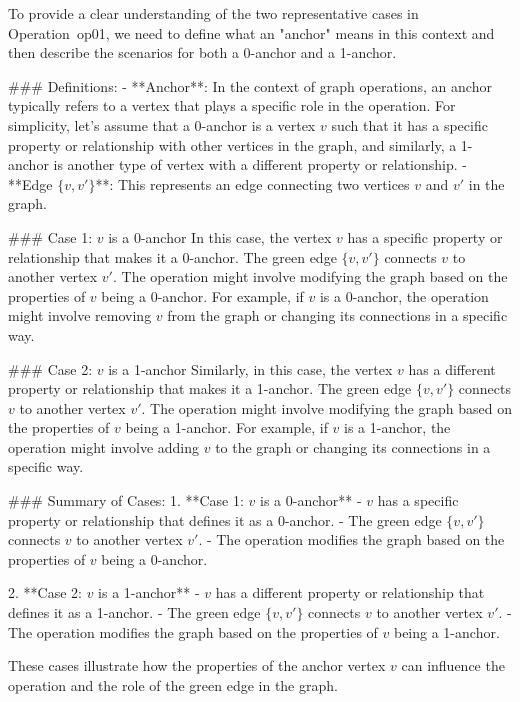 To provide a clear understanding of the two representative cases in Operation~op01, we need to define what an "anchor" means in this context and then describe the scenarios for both a 0-anchor and a 1-anchor.

### Definitions:
- **Anchor**: In the context of graph operations, an anchor typically refers to a vertex that plays a specific role in the operation. For simplicity, let's assume that a 0-anchor is a vertex \( v \) such that it has a specific property or relationship with other vertices in the graph, and similarly, a 1-anchor is another type of vertex with a different property or relationship.
- **Edge \(\{v, v'\}\)**: This represents an edge connecting two vertices \( v \) and \( v' \) in the graph.

### Case 1: \( v \) is a 0-anchor
In this case, the vertex \( v \) has a specific property or relationship that makes it a 0-anchor. The green edge \(\{v, v'\}\) connects \( v \) to another vertex \( v' \). The operation might involve modifying the graph based on the properties of \( v \) being a 0-anchor. For example, if \( v \) is a 0-anchor, the operation might involve removing \( v \) from the graph or changing its connections in a specific way.

### Case 2: \( v \) is a 1-anchor
Similarly, in this case, the vertex \( v \) has a different property or relationship that makes it a 1-anchor. The green edge \(\{v, v'\}\) connects \( v \) to another vertex \( v' \). The operation might involve modifying the graph based on the properties of \( v \) being a 1-anchor. For example, if \( v \) is a 1-anchor, the operation might involve adding \( v \) to the graph or changing its connections in a specific way.

### Summary of Cases:
1. **Case 1: \( v \) is a 0-anchor**
   - \( v \) has a specific property or relationship that defines it as a 0-anchor.
   - The green edge \(\{v, v'\}\) connects \( v \) to another vertex \( v' \).
   - The operation modifies the graph based on the properties of \( v \) being a 0-anchor.

2. **Case 2: \( v \) is a 1-anchor**
   - \( v \) has a different property or relationship that defines it as a 1-anchor.
   - The green edge \(\{v, v'\}\) connects \( v \) to another vertex \( v' \).
   - The operation modifies the graph based on the properties of \( v \) being a 1-anchor.

These cases illustrate how the properties of the anchor vertex \( v \) can influence the operation and the role of the green edge in the graph.